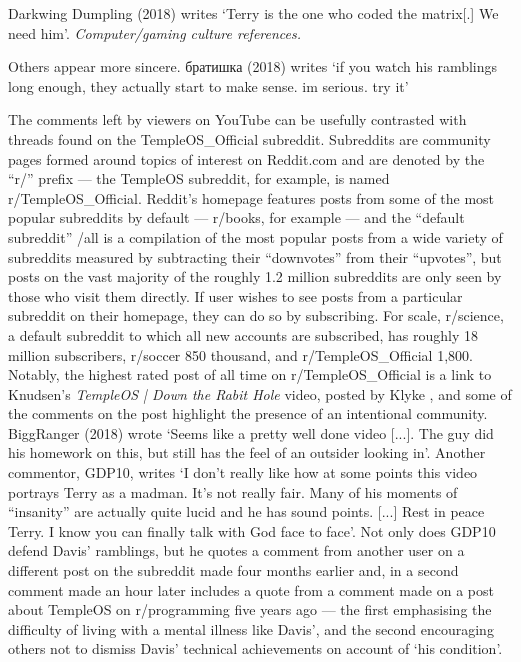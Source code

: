 \documentclass[Draft.tex]{subfiles}
\begin{document}
Darkwing Dumpling (2018) writes
`Terry is the one who coded the matrix[.] We need him'.
\textit{Computer/gaming culture references.}

Others appear more sincere.
братишка (2018) writes `if you watch his ramblings long enough,
they actually start to make sense. im serious. try it'


The comments left by viewers on YouTube can be usefully contrasted
with threads found on the TempleOS\_Official subreddit.
Subreddits are community pages formed around topics of interest on
Reddit.com and are denoted by the ``r/'' prefix --- the
TempleOS subreddit, for example, is named r/TempleOS\_Official.
Reddit's homepage features posts from some of the most popular
subreddits by default --- r/books, for example ---
and the ``default subreddit'' /all is a compilation of the most popular
posts from a wide variety of subreddits measured by subtracting their
``downvotes'' from their ``upvotes'',
but posts on the vast majority of the roughly 1.2 million subreddits
are only seen by those who visit them directly.
If user wishes to see posts from a particular subreddit on their
homepage, they can do so by subscribing.
For scale, r/science, a default subreddit to which all new accounts
are subscribed, has roughly 18 million subscribers,
r/soccer 850 thousand, and r/TempleOS\_Official 1,800.
Notably, the highest rated post of all time on r/TempleOS\_Official
is a link to Knudsen's \textit{TempleOS | Down the Rabit Hole} video,
posted by Klyke \parencite*{Klyke18},
and some of the comments on the post highlight the presence of
an intentional community.
BiggRanger (2018) wrote `Seems like a pretty well done video [...].
The guy did his homework on this,
but still has the feel of an outsider looking in'.
Another commentor, GDP10, writes
`I don't really like how at some points this video portrays Terry as a madman.
It's not really fair.  Many of his moments of ``insanity''
are actually quite lucid and he has sound points. [...]
Rest in peace Terry.  I know you can finally talk with God face to face'.
Not only does GDP10 defend Davis' ramblings, but he quotes a comment from
another user on a different post on the subreddit made four months earlier and,
in a second comment made an hour later includes a quote from a comment made
on a post about TempleOS on r/programming five years ago ---
the first emphasising the difficulty of living with a mental illness like
Davis', and the second encouraging others not to dismiss Davis'
technical achievements on account of `his condition'.
\end{document}
